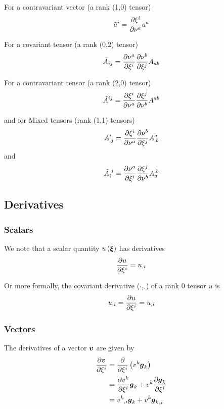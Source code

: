 For a contravariant vector (a rank (1,0) tensor)
\begin{equation}
  {\tilde{a}}^{i}= \dfrac{\partial \xi^{i}}{\partial \nu^{a}} a^{a}
\end{equation}

For a covariant tensor (a rank (0,2) tensor)
\begin{equation}
  {\tilde{A}}_{ij}= \dfrac{\partial \nu^{a}}{\partial \xi^{i}}  \dfrac{\partial \nu^{b}}{\partial \xi^{j}} A_{ab} 
\end{equation}

For a contravariant tensor (a rank (2,0) tensor)
\begin{equation}
  {\tilde{A}}^{ij}= \dfrac{\partial \xi^{i}}{\partial \nu^{a}}  \dfrac{\partial \xi^{j}}{\partial \nu^{b}} A^{ab}
\end{equation}

and for Mixed tensors (rank (1,1) tensors)
\begin{equation}
  {\tilde{A}}^{i}_{.j}= \dfrac{\partial \xi^{i}}{\partial \nu^{a}}  \dfrac{\partial \nu^{b}}{\partial \xi^{j}} A^{a}_{.b}
\end{equation}
and
\begin{equation}
  {\tilde{A}}_{i}^{.j}= \dfrac{\partial \nu^{a}}{\partial \xi^{i}}  \dfrac{\partial \xi^{j}}{\partial \nu^{b}} A_{a}^{.b}
\end{equation}

\subsection{Derivatives}
\label{subsec:function derivatives}

\subsubsection{Scalars}

We note that a scalar quantity $\fnof{u}{\vect{\xi}}$ has derivatives
\begin{equation}
   \dfrac{\partial u}{\partial \xi^{i}} = {u}_{,i} 
\end{equation}

Or more formally, the covariant derivative ($ {\cdot}_{;\cdot} $) of a
rank 0 tensor $u$ is
\begin{equation}
   {u}_{;i} = \dfrac{\partial u}{\partial \xi^{i}} = {u}_{,i} 
\end{equation}

\subsubsection{Vectors}

The derivatives of a vector $\vect{v}$ are given by
\begin{equation}
  \begin{split}
    \delby{\vect{v}}{\xi^{i}} &=
    \delby{}{\xi^{i}}\pbrac{v^{k}\vect{g}_{k}} \\
    &= \delby{v^{k}}{\xi^{i}}\vect{g}_{k}+v^{k}\delby{\vect{g}_{k}}{\xi^{i}} \\
    &= \partialderiv{v^{k}}{i}\vect{g}_{k}+v^{k}\partialderiv{\vect{g}_{k}}{i}
  \end{split}
\end{equation}

